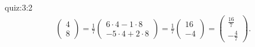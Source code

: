 \begin{answerof}{quiz:3:2}
\begin{align*}
    \begin{pmatrix}
      4\\8
    \end{pmatrix}
    =
    \frac{1}{7}
    \begin{pmatrix}
      6\cdot 4-1\cdot 8\\-5\cdot 4+2\cdot 8
    \end{pmatrix}
    =
    \frac{1}{7}
    \begin{pmatrix}
      16\\-4
    \end{pmatrix}
    =
    \begin{pmatrix}
      \frac{16}{7}\\-\frac{4}{7}
    \end{pmatrix}.
  \end{align*}



\end{answerof}
